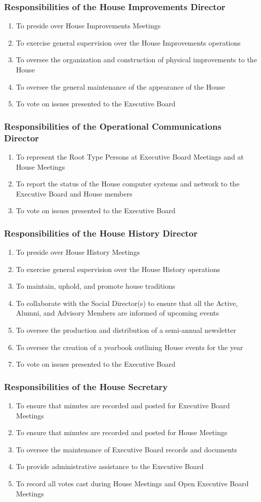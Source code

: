 \documentclass{article}
\newcommand{\asubsection}[1]{\subsubsection{#1} \label{#1}}
\begin{document}
\asubsection{Responsibilities of the House Improvements Director}
\begin{enumerate}
	\item To preside over House Improvements Meetings
	\item To exercise general supervision over the House Improvements operations
	\item To oversee the organization and construction of physical improvements to the House
	\item To oversee the general maintenance of the appearance of the House
	\item To vote on issues presented to the Executive Board
\end{enumerate}

\asubsection{Responsibilities of the Operational Communications Director}
\begin{enumerate}
	\item To represent the Root Type Persons at Executive Board Meetings and at House Meetings
	\item To report the status of the House computer systems and network to the Executive Board and House members
	\item To vote on issues presented to the Executive Board
\end{enumerate}

\asubsection{Responsibilities of the House History Director}
\begin{enumerate}
	\item To preside over House History Meetings
	\item To exercise general supervision over the House History operations
	\item To maintain, uphold, and promote house traditions
	\item To collaborate with the Social Director(s) to ensure that all the Active, Alumni, and Advisory Members are informed of upcoming events
	\item To oversee the production and distribution of a semi-annual newsletter
	\item To oversee the creation of a yearbook outlining House events for the year
	\item To vote on issues presented to the Executive Board
\end{enumerate}

\asubsection{Responsibilities of the House Secretary}
\begin{enumerate}
	\item To ensure that minutes are recorded and posted for Executive Board Meetings
	\item To ensure that minutes are recorded and posted for House Meetings
	\item To oversee the maintenance of Executive Board records and documents
	\item To provide administrative assistance to the Executive Board
	\item To record all votes cast during House Meetings and Open Executive Board Meetings
\end{enumerate}
\end{document}
